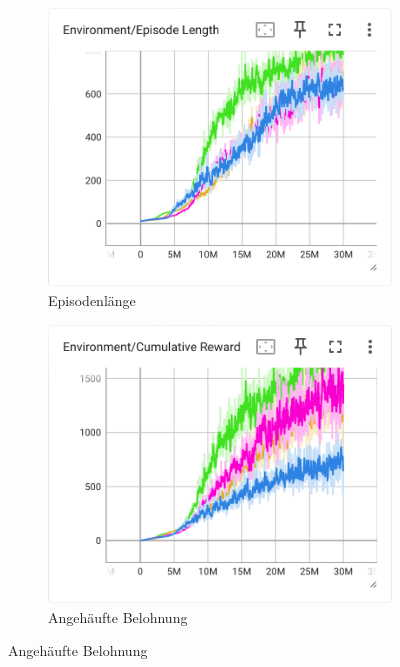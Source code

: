 \begin{figure}[H]
  \centering  
  \begin{subfigure}{.49\textwidth}
      \centering  
      \includegraphics[width=\textwidth]{img/116_130_131_132_episode_length}
      \caption{Episodenlänge}
      \label{fig:116_130_131_132_episode_length}
    \end{subfigure}
    \begin{subfigure}{.49\textwidth}
      \centering  
      \includegraphics[width=\textwidth]{img/116_130_131_132_cumulative_reward}
      \caption{Angehäufte Belohnung}
      \label{fig:116_130_131_132_cumulative_reward}

\end{subfigure}
\end{figure}
